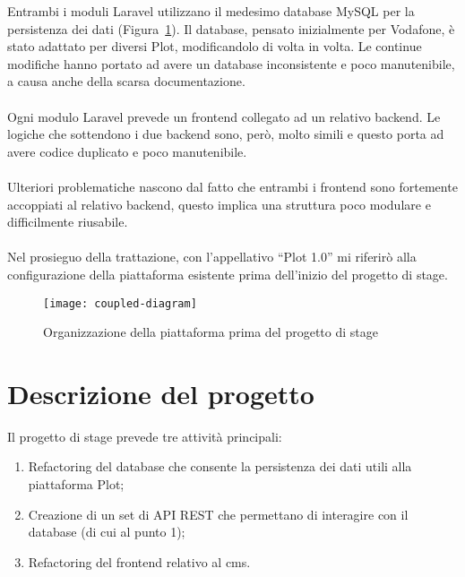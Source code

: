 Entrambi i moduli Laravel utilizzano il medesimo database MySQL per la persistenza dei dati (Figura~\ref{fig:coupled}). 
Il database, pensato inizialmente per Vodafone, è stato adattato per diversi Plot, modificandolo di volta in volta. Le continue modifiche hanno portato ad avere un database inconsistente e poco manutenibile, a causa anche della scarsa documentazione.
\\ \\
Ogni modulo Laravel prevede un \gls{frontend}\glsfirstoccur{} collegato ad un relativo \gls{backend}\glsfirstoccur{}. Le logiche che sottendono i due \gls{backend}\glsfirstoccur{} sono, però, molto simili e questo porta ad avere codice duplicato e poco manutenibile.
\\ \\
Ulteriori problematiche nascono dal fatto che entrambi i \gls{frontend}\glsfirstoccur{} sono fortemente accoppiati al relativo \gls{backend}\glsfirstoccur{}, questo implica una struttura poco modulare e difficilmente riusabile.
\\ \\
Nel prosieguo della trattazione, con l’appellativo “Plot 1.0” mi riferirò alla configurazione della piattaforma esistente prima dell'inizio del progetto di stage.

\begin{figure}[htbp]
\begin{center}
\texttt{[image: coupled-diagram]}
\caption{Organizzazione della piattaforma prima del progetto di stage}
\label{fig:coupled}
\end{center}
\end{figure}

\section{Descrizione del progetto}
Il progetto di stage prevede tre attività principali:
\begin{enumerate}
	\item Refactoring del database che consente la persistenza dei dati utili alla piattaforma Plot;
	\item Creazione di un set di API REST che permettano di interagire con il database (di cui al punto 1);
	\item Refactoring del \gls{frontend}\glsfirstoccur{} relativo al \gls{cms}\glsfirstoccur.
\end{enumerate}

